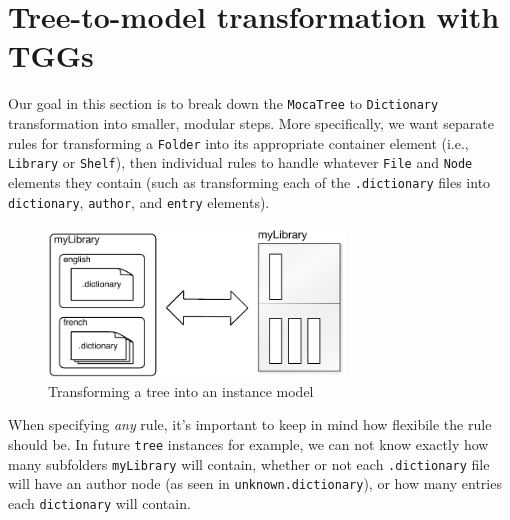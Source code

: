 \newpage
\section{Tree-to-model transformation with TGGs}
\genHeader

Our goal in this section is to break down the \texttt{MocaTree} to \texttt{Dictionary} transformation into smaller, modular steps. More specifically, we
want separate rules for transforming a \texttt{Folder} into its appropriate container element (i.e., \texttt{Library} or \texttt{Shelf}), then individual rules
to handle whatever \texttt{File} and \texttt{Node} elements they contain (such as transforming each of the \texttt{.dictionary} files into \texttt{dictionary},
\texttt{author}, and \texttt{entry} elements).

\vspace{0.5cm}

\begin{figure}[htp]
\begin{center}
  \includegraphics[width=0.7\textwidth]{goal}
  \caption{Transforming a tree into an instance model}
  \label{fig:treeToDictionary}
\end{center}
\end{figure}

\vspace{0.5cm}

When specifying \emph{any} rule, it's important to keep in mind how flexibile the rule should be. In future \texttt{tree} instances for example, we
can not know exactly how many subfolders \texttt{myLibrary} will contain, whether or not each \texttt{.dictionary} file will have an author node (as
seen in \texttt{unknown.dictionary}), or how many entries each \texttt{dictionary} will contain. 







